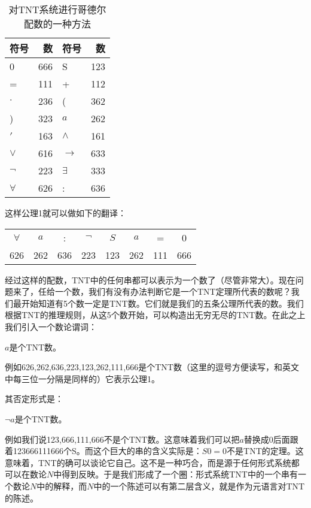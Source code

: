 \documentclass{article}
\begin{document}
\begin{table}[htbp]
\centering
\begin{tabular}{|l|r|l|r|}
\hline
符号 & 数 & 符号 & 数 \\
\hline
0 & 666 & S & 123 \\
\hline
= & 111 & + & 112 \\
\hline
$\cdot$ & 236 & ( & 362 \\
\hline
) & 323 & $a$ & 262 \\
\hline
$'$ & 163 & $\land$ & 161 \\
\hline
$\lor$ & 616 & $\to$ & 633 \\
\hline
$\lnot$ & 223 & $\exists$ & 333 \\
\hline
$\forall$ & 626 & : & 636 \\
\hline
\end{tabular}
\caption{对TNT系统进行哥德尔配数的一种方法}
\end{table}

这样公理1就可以做如下的翻译：

\begin{tabular}{cccccccc}
$\forall$ & $a$ & : & $\lnot$ & $S$ & $a$ & = & 0 \\
626 & 262 & 636 & 223 & 123 & 262 & 111 & 666 \\
\end{tabular}

经过这样的配数，TNT中的任何串都可以表示为一个数了（尽管非常大）。现在问题来了，任给一个数，我们有没有办法判断它是一个TNT定理所代表的数呢？我们最开始知道有5个数一定是TNT数。它们就是我们的五条公理所代表的数。我们根据TNT的推理规则，从这5个数开始，可以构造出无穷无尽的TNT数。在此之上我们引入一个数论谓词：

\begin{center}
$a$是个TNT数。
\end{center}

例如626,262,636,223,123,262,111,666是个TNT数（这里的逗号方便读写，和英文中每三位一分隔是同样的）它表示公理1。

其否定形式是：
\begin{center}
$\lnot a$是个TNT数。
\end{center}

例如我们说123,666,111,666不是个TNT数。这意味着我们可以把$a$替换成0后面跟着123666111666个S。而这个巨大的串的含义实际是：$S0 = 0$不是TNT的定理。这意味着，TNT的确可以谈论它自己。这不是一种巧合，而是源于任何形式系统都可以在数论$N$中得到反映。于是我们形成了一个圈：形式系统TNT中的一个串有一个数论$N$中的解释，而$N$中的一个陈述可以有第二层含义，就是作为元语言对TNT的陈述。
\end{document}
